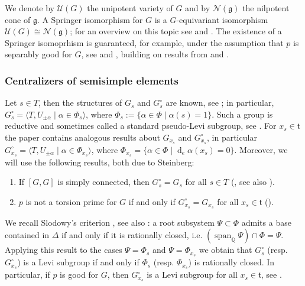\documentclass[12pt]{amsart}
\theoremstyle{definition}
\theoremstyle{remark}
\newcommand{\Q}{\mathbb{Q}}
\newcommand{\g}{\mathfrak{g}}
\renewcommand{\t}{\mathfrak{t}}
\newcommand{\N}{\mathcal{N}}
\newcommand{\U}{\mathcal{U}}
\newcommand{\diff}{\operatorname{d}}
\newcommand{\spn}{\operatorname{span}}
\begin{document}
We denote by $\U(G)$ the unipotent variety of $G$ and by $\N(\g)$ the nilpotent cone of $\g$.
A Springer isomorphism for $G$ is a $G$-equivariant isomorphism $\U(G) \cong \N(\g)$; for an overview on this topic see \cite[\S 6.20]{HuCCSAG} and \cite[\S 1.15]{Ca2}.
The existence of a Springer isomoprhism is guaranteed, for example, under the assumption that $p$ is separably good for $G$, see \cite[\S 4]{McN_optimal} and \cite[\S 2.4]{McNTes}, building on results from \cite{Springer_unipotent} and \cite[\S 9.3]{BR}.

\subsubsection{Centralizers of semisimple elements}
Let $s \in T$, then the structures of $G_s$ and $G_s^\circ$ are known, see \cite{St}; in particular, 
$G_s^\circ  = \langle T , U_{\pm \alpha} \mid \alpha \in \Phi_s \rangle$, where $\Phi_s := \{\alpha \in \Phi \mid \alpha(s) = 1\}$.
Such a group is reductive and sometimes called a standard pseudo-Levi subgroup, see \cite{SommersBC}.
For $x_s \in \t$ the paper \cite{St} contains analogous results about $G_{x_s}$ and $G_{x_s}^\circ$, in particular  $G_{x_s}^\circ  = \langle T , U_{\pm \alpha} \mid \alpha \in \Phi_{x_s} \rangle$, where 
$\Phi_{x_s} = \{\alpha \in \Phi \mid \diff_e \alpha(x_s) = 0\}$.
Moreover, we will use the following results, both due to Steinberg:
\begin{enumerate}
\item If $[G,G]$ is simply connected, then $G_s^\circ = G_s$ for all $s \in T$ (\cite{St}, see also \cite[Theorem 3.5.6]{Ca2}).
\item  $p$ is not a torsion prime for $G$ if and only if $G_{x_s}^\circ = G_{x_s}$ for all $x_s \in \t$ (\cite[Theorem 3.14]{St}).
\end{enumerate}

We recall Slodowy's criterion \cite[\S 3.5, Proposition]{Sl}, see also \cite[VI, 1, 7, Propostion 24]{Bour4}:
a root subsystem $\Psi \subset \Phi$ admits a base  contained in $\Delta$ if and only if it is rationally closed, i.e. $\left( \spn_\Q \Psi  \right) \cap \Phi = \Psi$.
Applying this result to the cases $\Psi = \Phi_s$ and $\Psi = \Phi_{x_s}$ we obtain that
$G_{s}^\circ$ (resp. $G_{x_s}^\circ$) is a Levi subgroup if and only if $\Phi_s$ (resp. $\Phi_{x_s}$) is rationally closed.
In particular, if $p$ is good for $G$, then $G_{x_s}^\circ$ is a Levi subgroup for all $x_s \in \t$, see \cite[Proposition 2.7.1]{Letellier}.
\end{document}
